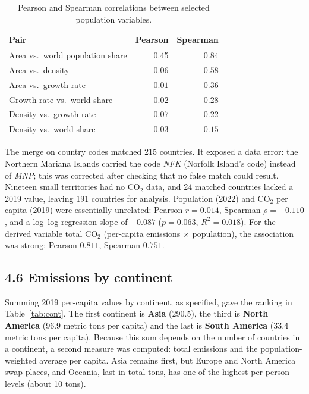 \documentclass[11pt,a4paper]{article}
\begin{document}
	\begin{table}[ht]
		\centering
		\small
		\caption{Pearson and Spearman correlations between selected population variables.}
		\label{tab:cor}
		\begin{tabular}{lrr}
			\toprule
			Pair & Pearson & Spearman \\
			\midrule
			Area vs.\ world population share & 0.45 & 0.84 \\
			Area vs.\ density                 & $-0.06$ & $-0.58$ \\
			Area vs.\ growth rate             & $-0.01$ & 0.36 \\
			Growth rate vs.\ world share      & $-0.02$ & 0.28 \\
			Density vs.\ growth rate          & $-0.07$ & $-0.22$ \\
			Density vs.\ world share          & $-0.03$ & $-0.15$ \\
			\bottomrule
		\end{tabular}
	\end{table}
	
	The merge on country codes matched 215 countries. It exposed a data error: the Northern Mariana Islands carried the code \textit{NFK} (Norfolk Island's code) instead of \textit{MNP}; this was corrected after checking that no false match could result. Nineteen small territories had no CO$_2$ data, and 24 matched countries lacked a 2019 value, leaving 191 countries for analysis. Population (2022) and CO$_2$ per capita (2019) were essentially unrelated: Pearson $r=0.014$, Spearman $\rho=-0.110$, and a log--log regression slope of $-0.087$ ($p=0.063$, $R^2=0.018$). For the derived variable total CO$_2$ (per-capita emissions $\times$ population), the association was strong: Pearson $0.811$, Spearman $0.751$.
	
	\subsection*{4.6 Emissions by continent}
	Summing 2019 per-capita values by continent, as specified, gave the ranking in Table~\ref{tab:cont}. The first continent is \textbf{Asia} (290.5), the third is \textbf{North America} (96.9 metric tons per capita) and the last is \textbf{South America} (33.4 metric tons per capita). Because this sum depends on the number of countries in a continent, a second measure was computed: total emissions and the population-weighted average per capita. Asia remains first, but Europe and North America swap places, and Oceania, last in total tons, has one of the highest per-person levels (about 10 tons).
	
\end{document}

